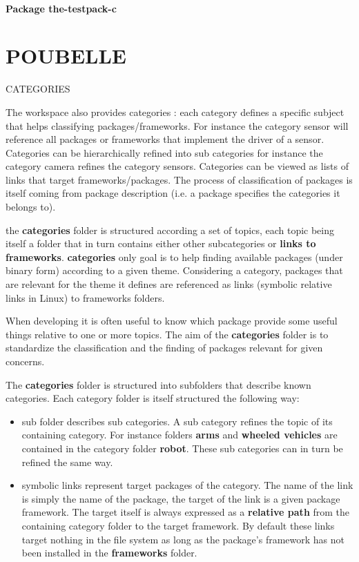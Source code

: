 \documentclass[12pt,a4paper]{article}
\begin{document}
\subsection{Package the-testpack-c}



\pagebreak

\part*{POUBELLE}


CATEGORIES

 The workspace also provides categories : each category defines a specific subject that helps classifying packages/frameworks. For instance the category sensor will reference all packages or frameworks that implement the driver of a sensor. Categories can be hierarchically refined into sub categories for instance the category camera refines the category sensors. Categories can be viewed as lists of links that target frameworks/packages. The process of classification of packages is itself coming from package description (i.e. a package specifies the categories it belongs to).
 
the \textbf{categories} folder is structured according a set of topics, each topic being itself a folder that in turn contains either other subcategories or \textbf{links to frameworks}. \textbf{categories} only goal is to help finding available packages (under binary form) according to a given theme. Considering a category, packages that are relevant for the theme it defines are referenced as links (symbolic relative links in Linux) to frameworks folders.

When developing it is often useful to know which package provide some useful things relative to one or more topics. The aim of the \textbf{categories} folder is to standardize the classification and the finding of packages relevant for given concerns.

The \textbf{categories} folder is structured into subfolders that describe known categories. Each category folder is itself structured the following way:
\begin{itemize}
\item sub folder describes sub categories. A sub category refines the topic of its containing category. For instance folders \textbf{arms} and \textbf{wheeled vehicles} are contained in the category folder \textbf{robot}. These sub categories can in turn be refined the same way.
\item symbolic links represent target packages of the category. The name of the link is simply the name of the package, the target of the link is a given package framework. The target itself is always expressed as a \textbf{relative path} from the containing category folder to the target framework. By default these links target nothing in the file system as long as the package's framework has not been installed in the \textbf{frameworks} folder.
\end{itemize}
\end{document}
